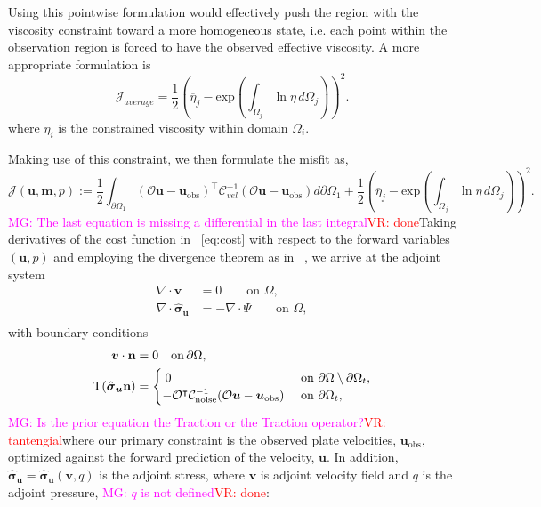 \documentclass[12pt]{article}
\newcommand{\mgnote}[1]{\textcolor{magenta}{MG: #1}}
\newcommand{\vrnote}[1]{\textcolor{red}{VR: #1}}
\newcommand{\mm}{{\ensuremath{\boldsymbol{m}}}}
\newcommand{\uu}{{\ensuremath{\boldsymbol{u}}}}
\newcommand{\vv}{{\ensuremath{\boldsymbol{v}}}}
\newcommand{\ssigma}{{\ensuremath{\boldsymbol{\sigma}}}}
\begin{document}
{Using this pointwise formulation would effectively push the region with the viscosity constraint toward a more homogeneous state, i.e. each point within the observation region is forced to have the observed effective viscosity. A more appropriate formulation is
\begin{equation}
 \mathcal{J}_{average}=\frac{1}{2}(\overline{\eta}_j - \text{exp}({\int_{\Omega_j} \ln \eta \,d\Omega_j}))^{2}.
\end{equation}
where $\overline{\eta}_i$ is the constrained viscosity within domain $\Omega_i$.

Making use of this constraint, we then formulate the misfit as,
\begin{equation}
  \mathcal{J}(\uu,\mm,p):= \frac{1}{2}\int_{\partial \Omega_1} (\mathcal{O}\uu-\uu_{\text{obs}})^\intercal\mathcal{C}^{-1}_{vel}(\mathcal{O}\uu-\uu_{\text{obs}})d\partial\Omega_1 
   +\frac{1}{2}(\overline{\eta}_j - \text{exp}({\int_{\Omega_j} \ln \eta \, d\Omega_j}))^{2}.
\label{eq:cost}
\end{equation}
\mgnote{The last equation is missing a differential in the last integral}\vrnote{done}Taking derivatives of the cost function in ~\eqref{eq:cost} with respect to the forward variables $(\uu,p)$ and employing the divergence theorem as in ~\citep{ratnaswamy2015adjoint}, we arrive at
the adjoint system
\begin{equation}
  \label{eq:adjoint}
  \begin{split}
    \nabla \cdot \vv &=0 \qquad  \text{on } \Omega, \\
    \nabla \cdot \hat \ssigma_\uu&=-\nabla \cdot \Psi   \qquad \text{on } \Omega, \\
  \end{split}
\end{equation}
with boundary conditions
\begin{align*}
  \vv\cdot \textbf{n}&=0 \quad \text{on} \, \partial \Omega, \\
  \boldmath{\mathrm{T}}(\hat\ssigma_\uu \textbf{n})
  &=\begin{cases} \:0 & \text{ on }\partial \Omega\setminus
  \partial\Omega_t, \\
  -\mathcal{O}^\intercal\mathcal{C}^{-1}_{\text{noise}}(\mathcal O \uu-\uu_{\text{obs}}) &\text{ on }
  \partial\Omega_t,
  \end{cases}
  \label{eq:adjoint}
\end{align*}
\mgnote{Is the prior equation the Traction or the Traction operator?}\vrnote{tantengial}where our primary constraint is the observed plate velocities, $\uu_{\text{obs}}$, optimized against the forward prediction of the velocity, $\uu$. In addition, $\hat\ssigma_\uu = \hat\ssigma_\uu(\vv,q)$ is the adjoint stress, where $\vv$ is adjoint velocity field and $q$ is the adjoint pressure, \mgnote{$q$ is not defined}\vrnote{done}: 
}
\end{document}
